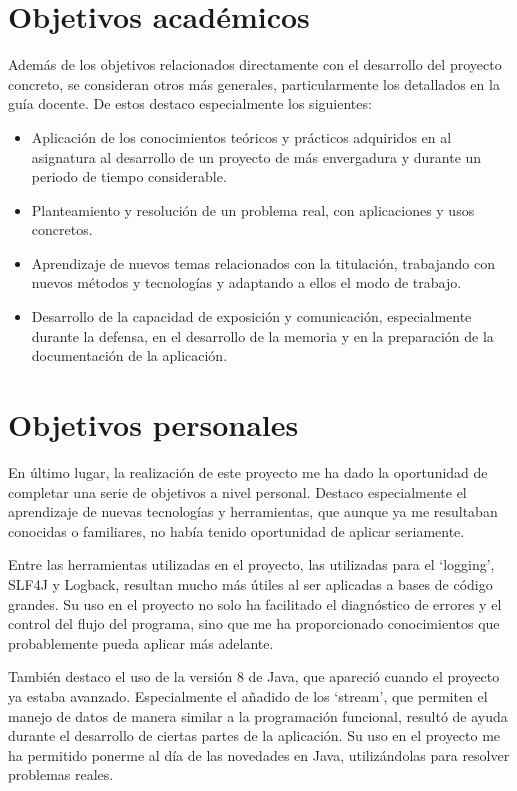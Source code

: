 \section{Objetivos académicos}
Además de los objetivos relacionados directamente con el desarrollo del proyecto concreto, se consideran otros más generales, particularmente los detallados en la guía docente.
De estos destaco especialmente los siguientes:
\begin{itemize}
	\item Aplicación de los conocimientos teóricos y prácticos adquiridos en al asignatura al desarrollo de un proyecto de más envergadura y durante un periodo de tiempo considerable.
	\item Planteamiento y resolución de un problema real, con aplicaciones y usos concretos.
	\item Aprendizaje de nuevos temas relacionados con la titulación, trabajando con nuevos métodos y tecnologías y adaptando a ellos el modo de trabajo.
	\item Desarrollo de la capacidad de exposición y comunicación, especialmente durante la defensa, en el desarrollo de la memoria y en la preparación de la documentación de la aplicación.
\end{itemize}

\section{Objetivos personales}
En último lugar, la realización de este proyecto me ha dado la oportunidad de completar una serie de objetivos a nivel personal.
Destaco especialmente el aprendizaje de nuevas tecnologías y herramientas, que aunque ya me resultaban conocidas o familiares, no había tenido oportunidad de aplicar seriamente.

Entre las herramientas utilizadas en el proyecto, las utilizadas para el `logging', SLF4J y Logback, resultan mucho más útiles al ser aplicadas a bases de código grandes.
Su uso en el proyecto no solo ha facilitado el diagnóstico de errores y el control del flujo del programa, sino que me ha proporcionado conocimientos que probablemente pueda aplicar más adelante.

También destaco el uso de la versión 8 de Java, que apareció cuando el proyecto ya estaba avanzado.
Especialmente el añadido de los `stream', que permiten el manejo de datos de manera similar a la programación funcional, resultó de ayuda durante el desarrollo de ciertas partes de la aplicación.
Su uso en el proyecto me ha permitido ponerme al día de las novedades en Java, utilizándolas para resolver problemas reales.